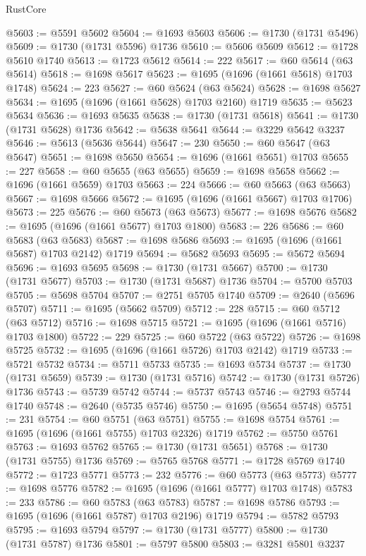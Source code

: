 \begin{lexlean}{RustCore}
\begin{coremodule}
@5603 := @5591 @5602
@5604 := @1693 @5603
@5606 := @1730 (@1731 @5496)
@5609 := @1730 (@1731 @5596) @1736
@5610 := @5606 @5609
@5612 := @1728 @5610 @1740
@5613 := @1723 @5612
@5614 := 222
@5617 := @60 @5614 (@63 @5614)
@5618 := @1698 @5617
@5623 := @1695 (@1696 (@1661 @5618) @1703 @1748)
@5624 := 223
@5627 := @60 @5624 (@63 @5624)
@5628 := @1698 @5627
@5634 := @1695 (@1696 (@1661 @5628) @1703 @2160) @1719
@5635 := @5623 @5634
@5636 := @1693 @5635
@5638 := @1730 (@1731 @5618)
@5641 := @1730 (@1731 @5628) @1736
@5642 := @5638 @5641
@5644 := @3229 @5642 @3237
@5646 := @5613 (@5636 @5644)
@5647 := 230
@5650 := @60 @5647 (@63 @5647)
@5651 := @1698 @5650
@5654 := @1696 (@1661 @5651) @1703
@5655 := 227
@5658 := @60 @5655 (@63 @5655)
@5659 := @1698 @5658
@5662 := @1696 (@1661 @5659) @1703
@5663 := 224
@5666 := @60 @5663 (@63 @5663)
@5667 := @1698 @5666
@5672 := @1695 (@1696 (@1661 @5667) @1703 @1706)
@5673 := 225
@5676 := @60 @5673 (@63 @5673)
@5677 := @1698 @5676
@5682 := @1695 (@1696 (@1661 @5677) @1703 @1800)
@5683 := 226
@5686 := @60 @5683 (@63 @5683)
@5687 := @1698 @5686
@5693 := @1695 (@1696 (@1661 @5687) @1703 @2142) @1719
@5694 := @5682 @5693
@5695 := @5672 @5694
@5696 := @1693 @5695
@5698 := @1730 (@1731 @5667)
@5700 := @1730 (@1731 @5677)
@5703 := @1730 (@1731 @5687) @1736
@5704 := @5700 @5703
@5705 := @5698 @5704
@5707 := @2751 @5705 @1740
@5709 := @2640 (@5696 @5707)
@5711 := @1695 (@5662 @5709)
@5712 := 228
@5715 := @60 @5712 (@63 @5712)
@5716 := @1698 @5715
@5721 := @1695 (@1696 (@1661 @5716) @1703 @1800)
@5722 := 229
@5725 := @60 @5722 (@63 @5722)
@5726 := @1698 @5725
@5732 := @1695 (@1696 (@1661 @5726) @1703 @2142) @1719
@5733 := @5721 @5732
@5734 := @5711 @5733
@5735 := @1693 @5734
@5737 := @1730 (@1731 @5659)
@5739 := @1730 (@1731 @5716)
@5742 := @1730 (@1731 @5726) @1736
@5743 := @5739 @5742
@5744 := @5737 @5743
@5746 := @2793 @5744 @1740
@5748 := @2640 (@5735 @5746)
@5750 := @1695 (@5654 @5748)
@5751 := 231
@5754 := @60 @5751 (@63 @5751)
@5755 := @1698 @5754
@5761 := @1695 (@1696 (@1661 @5755) @1703 @2326) @1719
@5762 := @5750 @5761
@5763 := @1693 @5762
@5765 := @1730 (@1731 @5651)
@5768 := @1730 (@1731 @5755) @1736
@5769 := @5765 @5768
@5771 := @1728 @5769 @1740
@5772 := @1723 @5771
@5773 := 232
@5776 := @60 @5773 (@63 @5773)
@5777 := @1698 @5776
@5782 := @1695 (@1696 (@1661 @5777) @1703 @1748)
@5783 := 233
@5786 := @60 @5783 (@63 @5783)
@5787 := @1698 @5786
@5793 := @1695 (@1696 (@1661 @5787) @1703 @2196) @1719
@5794 := @5782 @5793
@5795 := @1693 @5794
@5797 := @1730 (@1731 @5777)
@5800 := @1730 (@1731 @5787) @1736
@5801 := @5797 @5800
@5803 := @3281 @5801 @3237

\end{coremodule}
\end{lexlean}
